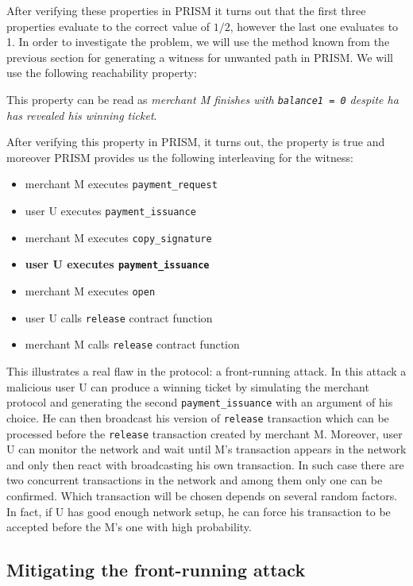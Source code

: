 After verifying these properties in PRISM it turns out that the first three properties 
evaluate to the correct value of $1/2$, however the last one evaluates to 1.
In order to investigate the problem, we will use the method known from the previous section for generating
a witness for unwanted path in PRISM.
We will use the following reachability property:

This property can be read as \emph{merchant M finishes with \lstinline{balance1 = 0} despite ha has revealed
his winning ticket}.

After verifying this property in PRISM, it turns out, the property is true and moreover PRISM provides us the 
following interleaving for the witness:
\begin{itemize}
\item merchant M executes \lstinline{payment_request}
\item user U executes \lstinline{payment_issuance}
\item merchant M executes \lstinline{copy_signature}
\item \textbf{user U executes \lstinline{payment_issuance}}
\item merchant M executes \lstinline{open}
\item user U calls \lstinline{release} contract function
\item merchant M calls \lstinline{release} contract function
\end{itemize}
This illustrates a real flaw in the protocol: a front-running attack.
In this attack a malicious user U can produce a winning ticket by simulating
the merchant protocol and generating the second \lstinline{payment_issuance} with an argument of his choice.
He can then broadcast his version of \lstinline{release} transaction which can be processed 
before the \lstinline{release} transaction created by merchant M.
Moreover, user U can monitor the network and wait until M's transaction appears in the network and only then
react with broadcasting his own transaction.
In such case there are two concurrent transactions in the network and among them only one can be confirmed.
Which transaction will be chosen depends on several random factors.
In fact, if U has good enough network setup, he can force his transaction to be accepted before the M's one
with high probability.

\subsection{Mitigating the front-running attack}

